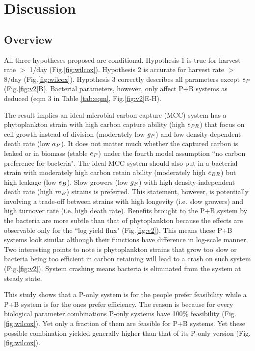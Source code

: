 \documentclass[../thesis.tex]{subfiles} %
\begin{document}
\section{Discussion}
\subsection{Overview}
All three hypotheses proposed are conditional.  Hypothesis 1 is true for harvest rate $>$ 1/day (Fig.\ref{fig:wilcox}).  Hypothesis 2 is accurate for harvest rate $>$ 8/day (Fig.\ref{fig:wilcox}).  Hypothesis 3 correctly describes all parameters except $e_P$ (Fig.\ref{fig:v2}B).  Bacterial parameters, however, only affect P+B systems as deduced (eqm 3 in Table \ref{tab:eqm}, Fig.\ref{fig:v2}E-H).

The result implies an ideal microbial carbon capture (MCC) system has a phytoplankton strain with high carbon capture ability (high $e_{PR}$) that focus on cell growth instead of division (moderately low $g_P$) and low density-dependent death rate (low $a_P$).  It does not matter much whether the captured carbon is leaked or in biomass (stable $e_P$) under the fourth model assumption ``no carbon preference for bacteria".  The ideal MCC system should also put in a bacterial strain with moderately high carbon retain ability (moderately high $e_{BR}$) but high leakage (low $e_B$).  Slow growers (low $g_B$) with high density-independent death rate (high $m_B$) strains is preferred.  This statement, however, is potentially involving a trade-off between strains with high longevity (i.e. slow growers) and high turnover rate (i.e. high death rate).  Benefits brought to the P+B system by the bacteria are more subtle than that of phytoplankton because the effects are observable only for the ``log yield flux" (Fig.\ref{fig:v2}).  This means these P+B systems look similar although their functions have difference in log-scale manner.  Two interesting points to note is phytoplankton strains that grow too slow or bacteria being too efficient in carbon retaining will lead to a crash on such system (Fig.\ref{fig:v2}).  System crashing means bacteria is eliminated from the system at steady state.

This study shows that a P-only system is for the people prefer feasibility while a P+B system is for the ones prefer efficiency.  The reason is because for every biological parameter combinations P-only systems have 100\% feasibility (Fig.\ref{fig:wilcox}).  Yet only a fraction of them are feasible for P+B systems.  Yet these possible combination yielded generally higher than that of its P-only version (Fig.\ref{fig:wilcox}).
\end{document}
